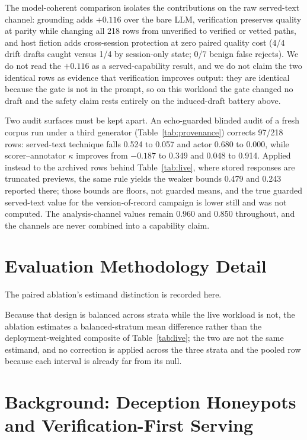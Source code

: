 The model-coherent comparison isolates the contributions on the raw served-text
channel: grounding adds $+0.116$ over the bare LLM, verification preserves
quality at parity while changing all 218 rows from unverified to verified or
vetted paths, and host fiction adds cross-session protection at zero paired
quality cost (4/4 drift drafts caught versus 1/4 by session-only state; 0/7
benign false rejects). We do not read the $+0.116$ as a served-capability
result, and we do not claim the two identical rows as evidence that
verification improves output: they are identical because the gate is not in
the prompt, so on this workload the gate changed no draft and the safety claim
rests entirely on the induced-draft battery above.

Two audit surfaces must be kept apart. An echo-guarded blinded audit of a
fresh corpus run under a third generator
(Table~\ref{tab:provenance}) corrects 97/218 rows: served-text technique
falls 0.524 to 0.057 and actor 0.680 to 0.000, while scorer--annotator
$\kappa$ improves from $-0.187$ to 0.349 and 0.048 to 0.914. Applied instead
to the archived rows behind Table~\ref{tab:live}, where stored responses are
truncated previews, the same rule yields the weaker bounds 0.479 and 0.243
reported there; those bounds are floors, not guarded means, and the true
guarded served-text value for the version-of-record campaign is lower still
and was not computed. The analysis-channel values remain 0.960 and 0.850
throughout, and the channels are never combined into a capability claim.

\section{Evaluation Methodology Detail}
\label{app:methods}

The paired ablation's estimand distinction is recorded here.

Because that design is balanced across strata while the live workload is not,
the ablation estimates a balanced-stratum mean difference rather than the
deployment-weighted composite of Table~\ref{tab:live}; the two are not the
same estimand, and no correction is applied across the three strata and the
pooled row because each interval is already far from its null.


\section{Background: Deception Honeypots and Verification-First Serving}


